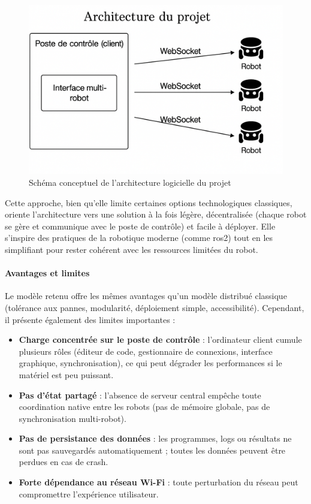 \begin{figure}[H]
    \centering
    \includegraphics[width=0.8\linewidth]{.//figures//high_level_design.png}
    \caption{\label{fig:conceptual_hld} Schéma conceptuel de l'architecture logicielle du projet}
\end{figure}

Cette approche, bien qu’elle limite certaines options technologiques classiques, oriente l’architecture vers une solution à la fois légère, décentralisée (chaque robot se gère et communique avec le poste de contrôle) et facile à déployer.
Elle s’inspire des pratiques de la robotique moderne (comme \acrshort{ros}2) tout en les simplifiant pour rester cohérent avec les ressources limitées du robot.

\paragraph{Avantages et limites}
Le modèle retenu offre les mêmes avantages qu'un modèle distribué classique (tolérance aux pannes, modularité, déploiement simple, accessibilité).
Cependant, il présente également des limites importantes :
\begin{itemize}
    \item \textbf{Charge concentrée sur le poste de contrôle} : l’ordinateur client cumule plusieurs rôles (éditeur de code, gestionnaire de connexions, interface graphique, synchronisation), ce qui peut dégrader les performances si le matériel est peu puissant.
    
    \item \textbf{Pas d’état partagé} : l’absence de serveur central empêche toute coordination native entre les robots (pas de mémoire globale, pas de synchronisation multi-robot).
    
    \item \textbf{Pas de persistance des données} : les programmes, logs ou résultats ne sont pas sauvegardés automatiquement ; toutes les données peuvent être perdues en cas de crash.
    
    \item \textbf{Forte dépendance au réseau Wi-Fi} : toute perturbation du réseau peut compromettre l’expérience utilisateur.
\end{itemize}

